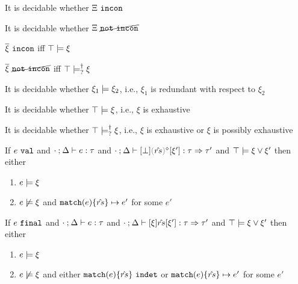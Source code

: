 \begin{lem}
  \label{lem:inconsistency-decidability}
  It is decidable whether $\Xi ~\mathtt{incon}$
\end{lem}
\begin{lem}
  \label{lem:not-not-inconsistency-decidability}
  It is decidable whether $\Xi ~\cancel{\mathtt{not~incon}}$
\end{lem}
\begin{lem}
  \label{lem:inconsistent-and-entailment}
  $\overline{\xi} ~\mathtt{incon}$ iff $\top \models \xi$
\end{lem}
\begin{lem}
  \label{lem:not-not-inconsistent-and-possible-entailment}
  $\overline{\xi} ~\cancel{\mathtt{not~incon}}$ iff $\top \models_{?}^{\dag} \xi$
\end{lem}
\begin{lem}
  \label{lem:redundancy-decidability}
  It is decidable whether $\xi_1 \models \xi_2$, i.e., $\xi_1$ is redundant with respect to $\xi_2$
\end{lem}
\begin{lem}
  \label{lem:exhaustiveness-decidability}
  It is decidable whether $\top \models \xi$, i.e., $\xi$ is exhaustive
\end{lem}
\begin{lem}
  \label{lem:not-not-exhaustiveness-decidability}
  It is decidable whether $\top \models_{?}^{\dag} \xi$, i.e., $\xi$ is exhaustive or $\xi$ is possibly exhaustive
\end{lem}
\begin{lem}
  \label{lem:val-match-progress}
  If $e ~\mathtt{val}$ and $\cdot \mathbin{;} \Delta \vdash e : \tau$ and $\czrulstyp{\cdot}{\Delta}{\cfalsity}{\rmpointer{\zrules}}{\xi'}{\tau}{\tau'}$ and $\top \models \xi \vee \xi'$
  then either
  \begin{enumerate}
    \item $e \models \xi$
    \item $e \not\models \xi$ and $\mathtt{match}(e) \{\hat{rs}\} \mapsto e'$ for some $e'$
  \end{enumerate}
\end{lem}
\begin{lem}
  \label{lem:final-match-progress}
  If $e ~\mathtt{final}$ and $\cdot \mathbin{;} \Delta \vdash e : \tau$ and $\cdot \mathbin{;} \Delta \vdash [\xi] \hat{rs} [\xi'] : \tau \Rightarrow \tau'$ and $\top \models \xi \vee \xi'$
  then either
  \begin{enumerate}
    \item $e \models \xi$
    \item $e \not\models \xi$ and either $\mathtt{match}(e) \{\hat{rs}\} ~\mathtt{indet}$ or $\mathtt{match}(e) \{\hat{rs}\} \mapsto e'$ for some $e'$
  \end{enumerate}
\end{lem}
